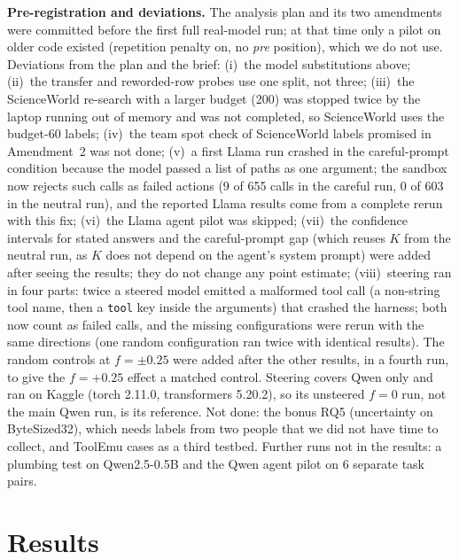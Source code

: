 \documentclass[conference]{IEEEtran}
\begin{document}
\textbf{Pre-registration and deviations.} The analysis plan and its two amendments were committed before the first full real-model run; at that time only a pilot on older code existed (repetition penalty on, no \emph{pre} position), which we do not use. Deviations from the plan and the brief:
(i)~the model substitutions above;
(ii)~the transfer and reworded-row probes use one split, not three;
(iii)~the ScienceWorld re-search with a larger budget (200) was stopped twice by the laptop running out of memory and was not completed, so ScienceWorld uses the budget-60 labels;
(iv)~the team spot check of ScienceWorld labels promised in Amendment~2 was not done;
(v)~a first Llama run crashed in the careful-prompt condition because the model passed a list of paths as one argument; the sandbox now rejects such calls as failed actions (9 of 655 calls in the careful run, 0 of 603 in the neutral run), and the reported Llama results come from a complete rerun with this fix;
(vi)~the Llama agent pilot was skipped;
(vii)~the confidence intervals for stated answers and the careful-prompt gap (which reuses $K$ from the neutral run, as $K$ does not depend on the agent's system prompt) were added after seeing the results; they do not change any point estimate;
(viii)~steering ran in four parts: twice a steered model emitted a malformed tool call (a non-string tool name, then a \texttt{tool} key inside the arguments) that crashed the harness; both now count as failed calls, and the missing configurations were rerun with the same directions (one random configuration ran twice with identical results). The random controls at $f=\pm0.25$ were added after the other results, in a fourth run, to give the $f=+0.25$ effect a matched control. Steering covers Qwen only and ran on Kaggle (torch 2.11.0, transformers 5.20.2), so its unsteered $f=0$ run, not the main Qwen run, is its reference.
Not done: the bonus RQ5 (uncertainty on ByteSized32), which needs labels from two people that we did not have time to collect, and ToolEmu cases as a third testbed. Further runs not in the results: a plumbing test on Qwen2.5-0.5B and the Qwen agent pilot on 6 separate task pairs.

\section{Results}
\end{document}
